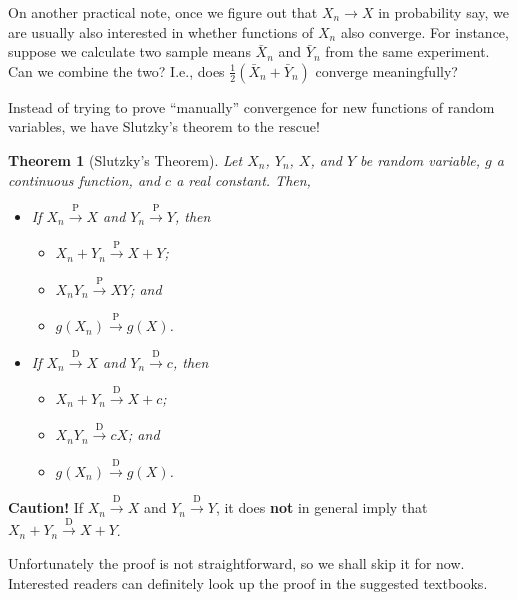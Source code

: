 \documentclass[
]{book}
\providecommand{\tightlist}{%
  \setlength{\itemsep}{0pt}\setlength{\parskip}{0pt}}
\newtheorem{theorem}{Theorem}[chapter]
\theoremstyle{definition}
\theoremstyle{definition}
\theoremstyle{definition}
\theoremstyle{definition}
\theoremstyle{remark}
\begin{document}
On another practical note, once we figure out that \(X_n\to X\) in probability say, we are usually also interested in whether functions of \(X_n\) also converge.
For instance, suppose we calculate two sample means \(\bar X_n\) and \(\bar Y_n\) from the same experiment.
Can we combine the two? I.e., does \(\frac{1}{2}(\bar X_n + \bar Y_n)\) converge meaningfully?

Instead of trying to prove ``manually'' convergence for new functions of random variables, we have Slutzky's theorem to the rescue!

\begin{theorem}[Slutzky's Theorem]

Let \(X_n\), \(Y_n\), \(X\), and \(Y\) be random variable, \(g\) a continuous function, and
\(c\) a real constant. Then,

\begin{itemize}
\item
  If \(X_n{\xrightarrow{\text{P}}} X\) and \(Y_n{\xrightarrow{\text{P}}} Y\),
  then

  \begin{itemize}
  \tightlist
  \item
    \(X_n+Y_n{\xrightarrow{\text{P}}} X+Y\);
  \item
    \(X_nY_n{\xrightarrow{\text{P}}} XY\); and
  \item
    \(g(X_n){\xrightarrow{\text{P}}} g(X)\).
  \end{itemize}
\item
  If \(X_n{\xrightarrow{\text{D}}} X\) and \(Y_n{\xrightarrow{\text{D}}} c\), then

  \begin{itemize}
  \tightlist
  \item
    \(X_n+Y_n{\xrightarrow{\text{D}}} X+c\);
  \item
    \(X_nY_n{\xrightarrow{\text{D}}} cX\); and
  \item
    \(g(X_n){\xrightarrow{\text{D}}} g(X)\).
  \end{itemize}
\end{itemize}

\end{theorem}

\textbf{Caution!} If \(X_n{\xrightarrow{\text{D}}} X\) and
\(Y_n{\xrightarrow{\text{D}}} Y\), it does \textbf{not} in general imply that
\(X_n+Y_n{\xrightarrow{\text{D}}} X+Y\).

Unfortunately the proof is not straightforward, so we shall skip it for now.
Interested readers can definitely look up the proof in the suggested textbooks.
\end{document}
